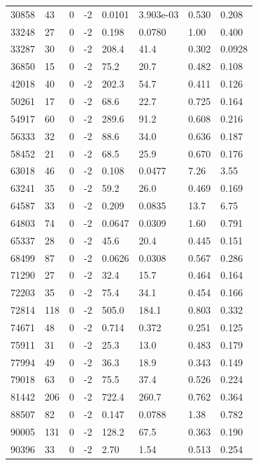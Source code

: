 \documentclass[preview]{standalone}
\begin{document}
{{{{{{{\begin{tabular}{L{1.2cm}C{1.2cm} C{0.3cm}C{0.5cm} C{1.4cm}C{1.4cm} C{1.4cm}C{1.4cm}}
  30858  &    43  & 0     & -2 &  0.0101  & 3.903e-03  & 0.530 &  0.208   \\ 
  33248  &    27  & 0     & -2 &  0.198  & 0.0780  & 1.00 &  0.400   \\ 
  33287  &    30  & 0     & -2 &  208.4  & 41.4  & 0.302 &  0.0928   \\ 
  36850  &    15  & 0     & -2 &  75.2  & 20.7  & 0.482 &  0.108   \\ 
  42018  &    40  & 0     & -2 &  202.3  & 54.7  & 0.411 &  0.126   \\ 
  50261  &    17  & 0     & -2 &  68.6  & 22.7  & 0.725 &  0.164   \\ 
  54917  &    60  & 0     & -2 &  289.6  & 91.2  & 0.608 &  0.216   \\ 
  56333  &    32  & 0     & -2 &  88.6  & 34.0  & 0.636 &  0.187   \\ 
  58452  &    21  & 0     & -2 &  68.5  & 25.9  & 0.670 &  0.176   \\ 
  63018  &    46  & 0     & -2 &  0.108  & 0.0477  & 7.26 &  3.55   \\ 
  63241  &    35  & 0     & -2 &  59.2  & 26.0  & 0.469 &  0.169   \\ 
  64587  &    33  & 0     & -2 &  0.209  & 0.0835  & 13.7 &  6.75   \\ 
  64803  &    74  & 0     & -2 &  0.0647  & 0.0309  & 1.60 &  0.791   \\ 
  65337  &    28  & 0     & -2 &  45.6  & 20.4  & 0.445 &  0.151   \\ 
  68499  &    87  & 0     & -2 &  0.0626  & 0.0308  & 0.567 &  0.286   \\ 
  71290  &    27  & 0     & -2 &  32.4  & 15.7  & 0.464 &  0.164   \\ 
  72203  &    35  & 0     & -2 &  75.4  & 34.1  & 0.454 &  0.166   \\ 
  72814  &   118  & 0     & -2 &  505.0  & 184.1  & 0.803 &  0.332   \\ 
  74671  &    48  & 0     & -2 &  0.714  & 0.372  & 0.251 &  0.125   \\ 
  75911  &    31  & 0     & -2 &  25.3  & 13.0  & 0.483 &  0.179   \\ 
  77994  &    49  & 0     & -2 &  36.3  & 18.9  & 0.343 &  0.149   \\ 
  79018  &    63  & 0     & -2 &  75.5  & 37.4  & 0.526 &  0.224   \\ 
  81442  &   206  & 0     & -2 &  722.4  & 260.7  & 0.762 &  0.364   \\ 
  88507  &    82  & 0     & -2 &  0.147  & 0.0788  & 1.38 &  0.782   \\ 
  90005  &   131  & 0     & -2 &  128.2  & 67.5  & 0.363 &  0.190   \\ 
  90396  &    33  & 0     & -2 &  2.70  & 1.54  & 0.513 &  0.254   \\ 
\hline 
\end{tabular} 

}}}}}}}
\end{document}
